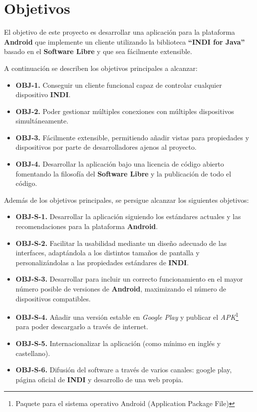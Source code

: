 \chapter{Objetivos}

El objetivo de este proyecto es desarrollar una aplicación para la plataforma \textbf{Android} que implemente un cliente utilizando la  biblioteca \textbf{``INDI for Java''} basado en el \textbf{Software Libre} y que sea fácilmente extensible.

\bigskip
A continuación se describen los objetivos principales a alcanzar:

\begin{itemize}
  \item \textbf{OBJ-1.} Conseguir un cliente funcional capaz de controlar cualquier dispositivo \textbf{INDI}.
  \item \textbf{OBJ-2.} Poder gestionar múltiples conexiones con múltiples dispositivos simultáneamente.
  \item \textbf{OBJ-3.} Fácilmente extensible, permitiendo añadir vistas para propiedades y  dispositivos por parte de desarrolladores ajenos al proyecto.
  \item \textbf{OBJ-4.} Desarrollar la aplicación bajo una licencia de código abierto fomentando la filosofía del \textbf{Software Libre} y la publicación de todo el código.
\end{itemize}

\bigskip
Además de los objetivos principales, se persigue alcanzar los siguientes objetivos:

\begin{itemize}
  \item \textbf{OBJ-S-1.} Desarrollar la aplicación siguiendo los estándares actuales y las recomendaciones para la plataforma \textbf{Android}.
  \item \textbf{OBJ-S-2.} Facilitar la usabilidad mediante un diseño adecuado de las interfaces, adaptándola a los distintos tamaños de pantalla y personalizándolas a las propiedades estándares de \textbf{INDI}.
  \item \textbf{OBJ-S-3.} Desarrollar para incluir un correcto funcionamiento en el mayor número posible de versiones de \textbf{Android}, maximizando el número de dispositivos compatibles.
  \item \textbf{OBJ-S-4.} Añadir una versión estable en \textit{Google Play} y publicar el \textit{APK}\footnote{Paquete para el sistema operativo Android (Application Package File)} para poder descargarlo a través de internet.
  \item \textbf{OBJ-S-5.} Internacionalizar la aplicación (como mínimo en inglés y castellano).
  \item \textbf{OBJ-S-6.} Difusión del software a través de varios canales: google play, página oficial de \textbf{INDI} y desarrollo de una web propia.
\end{itemize}

